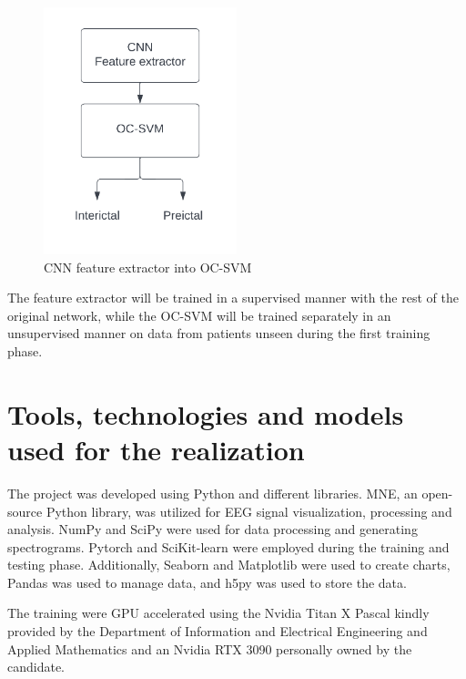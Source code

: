\begin{figure}[ht]
    \centering
    \includegraphics[width=0.5\textwidth]{images/Contribution/cnn-anomaly-detector-architecture.png}
    \caption{\gls{CNN} feature extractor into \gls{OC-SVM}}
    \label{fig:cnn-anomaly-detector-architecture}
\end{figure}

The feature extractor will be trained in a supervised manner with the rest of the original network, while the \gls{OC-SVM} will be trained separately in an unsupervised manner on data from patients unseen during the first training phase.

\section{Tools, technologies and models used for the realization}
The project was developed using Python and different libraries. MNE, an open-source Python library, was utilized for EEG signal visualization, processing and analysis. NumPy and SciPy were used for data processing and generating spectrograms. Pytorch and SciKit-learn were employed during the training and testing phase. Additionally, Seaborn and Matplotlib were used to create charts, Pandas was used to manage data, and h5py was used to store the data.

The training were GPU accelerated using the Nvidia Titan X Pascal kindly provided by the Department of Information and Electrical Engineering and Applied Mathematics and an Nvidia RTX 3090 personally owned by the candidate.